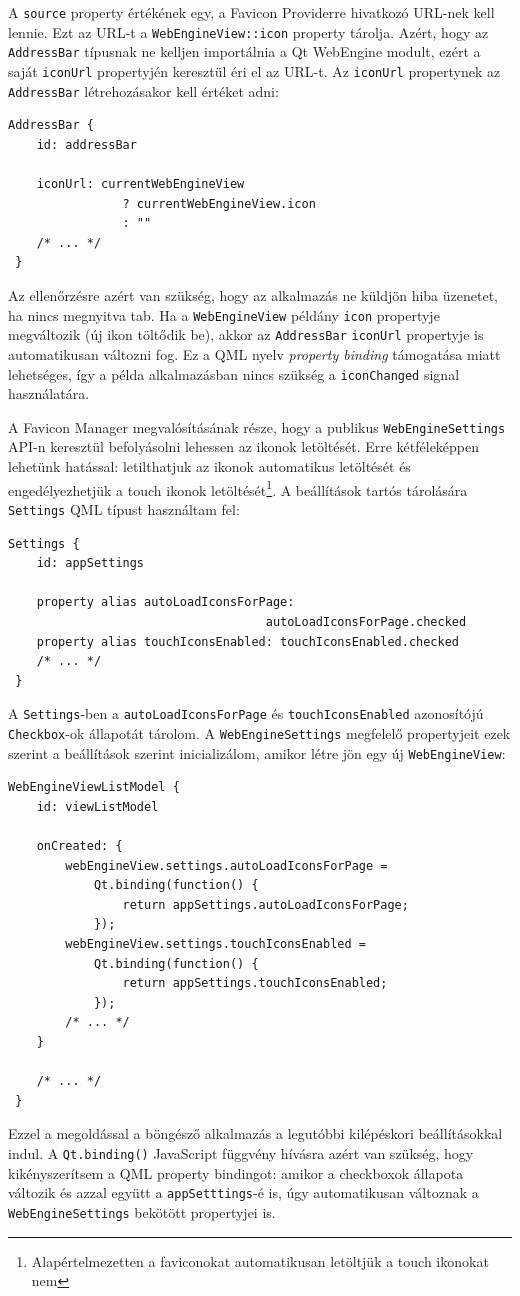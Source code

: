 \documentclass[12pt]{report}
\begin{document}
A \texttt{source} property értékének egy, a Favicon Providerre hivatkozó URL-nek kell lennie.
Ezt az URL-t a \texttt{WebEngineView::icon} property tárolja. Azért, hogy az
\texttt{AddressBar} típusnak ne kelljen importálnia a Qt WebEngine modult, ezért a saját
\texttt{iconUrl} propertyjén keresztül éri el az URL-t. Az \texttt{iconUrl} propertynek az
\texttt{AddressBar} létrehozásakor kell értéket adni:
\begin{lstlisting}[title=main.qml]
 AddressBar {
    id: addressBar

    iconUrl: currentWebEngineView
                ? currentWebEngineView.icon
                : ""
    /* ... */
 }
\end{lstlisting}
Az ellenőrzésre azért van szükség, hogy az alkalmazás ne küldjön hiba üzenetet, ha nincs
megnyitva tab. Ha a \texttt{WebEngineView} példány \texttt{icon} propertyje megváltozik
(új ikon töltődik be), akkor az \texttt{AddressBar} \texttt{iconUrl} propertyje is
automatikusan változni fog. Ez a QML nyelv \textit{property binding} támogatása miatt
lehetséges, így a példa alkalmazásban nincs szükség a \texttt{iconChanged} signal
használatára.

A Favicon Manager megvalósításának része, hogy a publikus \texttt{WebEngineSettings}
API-n keresztül befolyásolni lehessen az ikonok letöltését. Erre kétféleképpen lehetünk
hatással: letilthatjuk az ikonok automatikus letöltését és engedélyezhetjük a touch
ikonok letöltését\footnote{Alapértelmezetten a faviconokat automatikusan letöltjük a touch
ikonokat nem}. A beállítások tartós tárolására \texttt{Settings} QML típust használtam fel:
\begin{lstlisting}[title=main.qml]
 Settings {
    id: appSettings

    property alias autoLoadIconsForPage:
                                    autoLoadIconsForPage.checked
    property alias touchIconsEnabled: touchIconsEnabled.checked
    /* ... */
 }
\end{lstlisting}
A \texttt{Settings}-ben a \texttt{autoLoadIconsForPage} és \texttt{touchIconsEnabled}
azonosítójú \texttt{Checkbox}-ok állapotát tárolom. A \texttt{WebEngineSettings} megfelelő
propertyjeit ezek szerint a beállítások szerint inicializálom, amikor létre jön egy új
\texttt{WebEngineView}:
\begin{lstlisting}[title=main.qml]
 WebEngineViewListModel {
    id: viewListModel

    onCreated: {
        webEngineView.settings.autoLoadIconsForPage =
            Qt.binding(function() {
                return appSettings.autoLoadIconsForPage;
            });
        webEngineView.settings.touchIconsEnabled =
            Qt.binding(function() {
                return appSettings.touchIconsEnabled;
            });
        /* ... */
    }

    /* ... */
 }
\end{lstlisting}
Ezzel a megoldással a böngésző alkalmazás a legutóbbi kilépéskori beállításokkal indul. A
\texttt{Qt.binding()} JavaScript függvény hívásra azért van szükség, hogy kikényszerítsem
a QML property bindingot: amikor a checkboxok állapota változik és azzal együtt
a \texttt{appSetttings}-é is, úgy automatikusan változnak a \texttt{WebEngineSettings}
bekötött propertyjei is.
\end{document}
